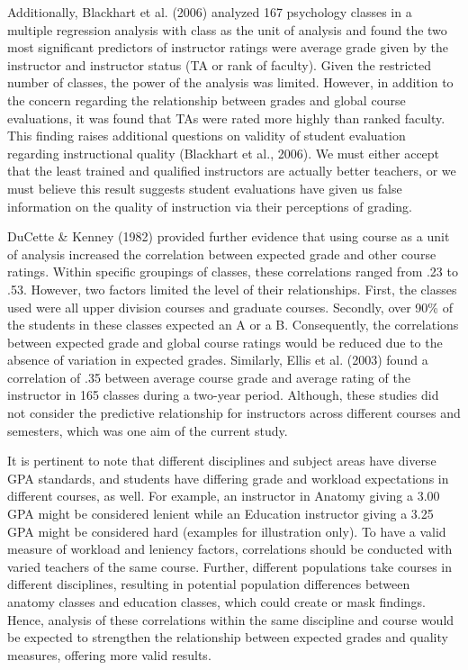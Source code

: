 \documentclass[man]{apa6}
\theoremstyle{definition}
\theoremstyle{definition}
\theoremstyle{definition}
\theoremstyle{remark}
\begin{document}
Additionally, Blackhart et al. (2006) analyzed 167 psychology classes in
a multiple regression analysis with class as the unit of analysis and
found the two most significant predictors of instructor ratings were
average grade given by the instructor and instructor status (TA or rank
of faculty). Given the restricted number of classes, the power of the
analysis was limited. However, in addition to the concern regarding the
relationship between grades and global course evaluations, it was found
that TAs were rated more highly than ranked faculty. This finding raises
additional questions on validity of student evaluation regarding
instructional quality (Blackhart et al., 2006). We must either accept
that the least trained and qualified instructors are actually better
teachers, or we must believe this result suggests student evaluations
have given us false information on the quality of instruction via their
perceptions of grading.

DuCette \& Kenney (1982) provided further evidence that using course as
a unit of analysis increased the correlation between expected grade and
other course ratings. Within specific groupings of classes, these
correlations ranged from .23 to .53. However, two factors limited the
level of their relationships. First, the classes used were all upper
division courses and graduate courses. Secondly, over 90\% of the
students in these classes expected an A or a B. Consequently, the
correlations between expected grade and global course ratings would be
reduced due to the absence of variation in expected grades. Similarly,
Ellis et al. (2003) found a correlation of .35 between average course
grade and average rating of the instructor in 165 classes during a
two-year period. Although, these studies did not consider the predictive
relationship for instructors across different courses and semesters,
which was one aim of the current study.

It is pertinent to note that different disciplines and subject areas
have diverse GPA standards, and students have differing grade and
workload expectations in different courses, as well. For example, an
instructor in Anatomy giving a 3.00 GPA might be considered lenient
while an Education instructor giving a 3.25 GPA might be considered hard
(examples for illustration only). To have a valid measure of workload
and leniency factors, correlations should be conducted with varied
teachers of the same course. Further, different populations take courses
in different disciplines, resulting in potential population differences
between anatomy classes and education classes, which could create or
mask findings. Hence, analysis of these correlations within the same
discipline and course would be expected to strengthen the relationship
between expected grades and quality measures, offering more valid
results.
\end{document}
